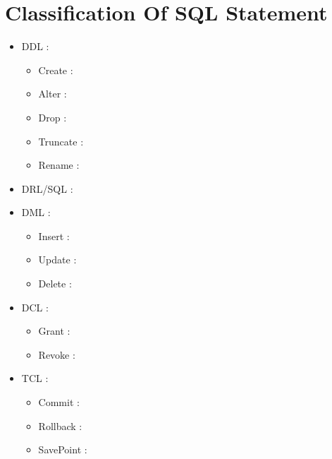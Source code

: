 \section{Classification Of SQL Statement}
\begin{itemize}
    \item DDL :
    \begin{itemize}
        \item Create :
        \item Alter : 
        \item Drop :
        \item Truncate :
        \item Rename : 
    \end{itemize}
    
    \item DRL/SQL :
    \item DML :
      \begin{itemize}
        \item Insert :
        \item Update :
        \item Delete :
      \end{itemize}
    \item DCL :
    \begin{itemize}
        \item Grant :
        \item Revoke :
    \end{itemize}

    \item TCL :
    \begin{itemize}
        \item Commit :
        \item Rollback :
        \item SavePoint :
    \end{itemize}
\end{itemize}

